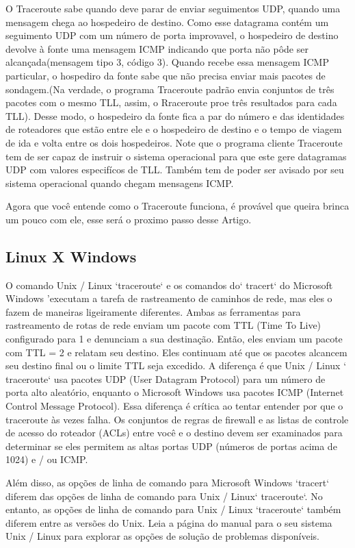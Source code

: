 \documentclass[
	article,			%
	11pt,				%
	oneside,			%
	a4paper,			%
	section=TITLE,		%
	english,			%
	brazil,				%
	sumario=tradicional
	]{abntex2}
\begin{document}
O Traceroute sabe quando deve parar de enviar seguimentos UDP, quando uma mensagem chega ao hospedeiro de destino. Como esse datagrama contém um seguimento UDP com um número de porta improvavel, o hospedeiro de destino devolve à fonte uma mensagem ICMP indicando que porta não pôde ser alcançada(mensagem tipo 3, código 3). Quando recebe essa mensagem ICMP particular, o hospediro da fonte sabe que não precisa enviar mais pacotes de sondagem.(Na verdade, o programa Traceroute padrão envia conjuntos de três pacotes com o mesmo TLL, assim, o Rraceroute proe três resultados para cada TLL). Desse modo, o hospedeiro da fonte fica a par do número e das identidades de roteadores que estão entre ele e o hospedeiro de destino e o tempo de viagem de ida e volta entre os dois hospedeiros. Note que o programa cliente Traceroute tem de ser capaz de instruir o sistema operacional para que este gere datagramas UDP com valores especifícos de TLL. Também tem de poder ser avisado por seu sistema operacional quando chegam mensagens ICMP.

Agora que você entende como o Traceroute funciona, é provável que queira brinca um pouco com ele, esse será o proximo passo desse Artigo.

\subsection{Linux X Windows}
O comando Unix / Linux `traceroute` e os comandos do` tracert` do Microsoft Windows 'executam a tarefa de rastreamento de caminhos de rede, mas eles o fazem de maneiras ligeiramente diferentes. Ambas as ferramentas para rastreamento de rotas de rede enviam um pacote com TTL (Time To Live) configurado para 1 e denunciam a sua destinação. Então, eles enviam um pacote com TTL = 2 e relatam seu destino. Eles continuam até que os pacotes alcancem seu destino final ou o limite TTL seja excedido. A diferença é que Unix / Linux ` traceroute` usa pacotes UDP (User Datagram Protocol) para um número de porta alto aleatório, enquanto o Microsoft Windows usa pacotes ICMP (Internet Control Message Protocol). Essa diferença é crítica ao tentar entender por que o traceroute às vezes falha. Os conjuntos de regras de firewall e as listas de controle de acesso do roteador (ACLs) entre você e o destino devem ser examinados para determinar se eles permitem as altas portas UDP (números de portas acima de 1024) e / ou ICMP.\cite{tech-faq}

Além disso, as opções de linha de comando para Microsoft Windows `tracert` diferem das opções de linha de comando para Unix / Linux` traceroute`. No entanto, as opções de linha de comando para Unix / Linux `traceroute` também diferem entre as versões do Unix. Leia a página do manual para o seu sistema Unix / Linux para explorar as opções de solução de problemas disponíveis.
\end{document}
